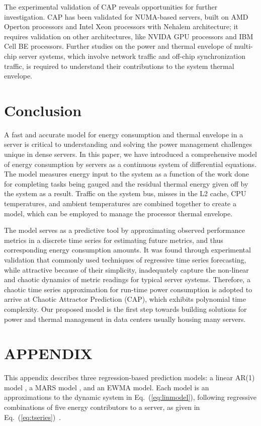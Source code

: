\documentclass[prodmode,acmtaco,pdftex]{acmsmall}
\newcommand{\equationname}{Eq.}
\begin{document}
The experimental validation of CAP reveals opportunities for further
investigation.  CAP has been validated for NUMA-based servers, built on
AMD Operton processors and Intel Xeon processors with Nehalem
architecture; it requires validation on other architectures, like NVIDA
GPU processors and IBM Cell BE processors.  Further studies on the power
and thermal envelope of multi-chip server systems, which involve network
traffic and off-chip synchronization traffic, is required to understand
their contributions to the system thermal envelope.
\section{Conclusion}
\label{sec:conclusions}
A fast and accurate model for energy consumption and thermal envelope in
a server is critical to understanding and solving the power management
challenges unique in dense servers.  In this paper, we have introduced a
comprehensive model of energy consumption by servers as a continuous
system of differential equations.  The model measures energy input to
the system as a function of the work done for completing tasks being
gauged and the residual thermal energy given off by the system as a
result.  Traffic on the system bus, misses in the L2 cache, CPU
temperatures, and ambient temperatures are combined together to create a
model, which can be employed to manage the processor thermal envelope.

The model serves as a predictive tool by approximating observed
performance metrics in a discrete time series for estimating future
metrics, and thus corresponding energy consumption amounts.  It was
found through experimental validation that commonly used techniques of
regressive time series forecasting, while attractive because of their
simplicity, inadequately capture the non-linear and chaotic dynamics of
metric readings for typical server systems.  Therefore, a chaotic time
series approximation for run-time power consumption is adopted to arrive
at Chaotic Attractor Prediction (CAP), which exhibits polynomial time
complexity.  Our proposed model is the first step towards building
solutions for power and thermal management in data centers usually
housing many servers.
\appendix
\section*{APPENDIX}
\setcounter{section}{1} 
This appendix describes three regression-based prediction models: a linear
AR(1) model \cite{Box1994}, a MARS model \cite{Friedman1991}, and an
EWMA model. 
Each model is an  approximations to the dynamic system in
\equationname~(\ref{eq:linmodel}), following regressive combinations of
five energy contributors to a server, as given in 
\equationname~(\ref{eq:tseries})~\cite{Lewis2008}.
\end{document}
